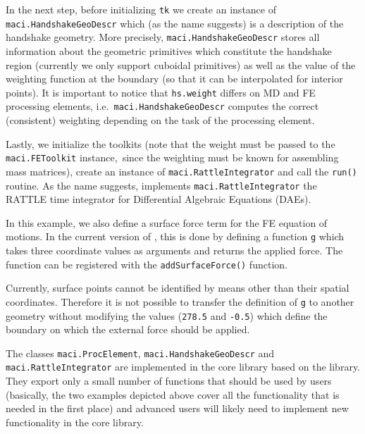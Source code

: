 In the next step, before initializing \lstinline[style=PYTHON]|tk| we create an instance of \lstinline[style=PYTHON]|maci.HandshakeGeoDescr| which (as the name suggests) is a description of the handshake geometry. More precisely, \lstinline[style=PYTHON]|maci.HandshakeGeoDescr| stores all information about the geometric primitives which constitute the handshake region (currently we only support cuboidal primitives) as well as the value of the weighting function at the boundary (so that it can be interpolated for interior points). It is important to notice that \lstinline[style=PYTHON]|hs.weight| differs on MD and FE processing elements, i.e.~\lstinline[style=PYTHON]|maci.HandshakeGeoDescr| computes the correct (consistent) weighting depending on the task of the processing element.\newline

Lastly, we initialize the toolkits (note that the weight must be passed to the \lstinline[style=PYTHON]|maci.FEToolkit| instance,~since the weighting must be known for assembling mass matrices), create an instance of \lstinline[style=PYTHON]|maci.RattleIntegrator| and call the \lstinline[style=PYTHON]|run()| routine. As the name suggests, implements \lstinline[style=PYTHON]|maci.RattleIntegrator| the RATTLE time integrator for Differential Algebraic Equations (DAEs).\newline

In this example, we also define a surface force term for the FE equation of motions. In the current version of \MACI, this is done by defining a function \lstinline[style=PYTHON]|g| which takes three coordinate values as arguments and returns the applied force. The function can be registered with the \lstinline[style=PYTHON]|addSurfaceForce()| function.

Currently, surface points cannot be identified by means other than their spatial coordinates. Therefore it is not possible to transfer the definition of \lstinline[style=PYTHON]|g| to another geometry without modifying the values (\lstinline[style=PYTHON]|278.5| and \lstinline[style=PYTHON]|-0.5|) which define the boundary on which the external force should be applied.\newline

The classes \lstinline[style=PYTHON]|maci.ProcElement|, \lstinline[style=PYTHON]|maci.HandshakeGeoDescr| and \lstinline[style=PYTHON]|maci.RattleIntegrator| are implemented in the core library based on the \MACI \CPP library. They export only a small number of functions that should be used by users (basically, the two examples depicted above cover all the functionality that is needed in the first place) and advanced users will likely need to implement new functionality in the \MACI core library.

